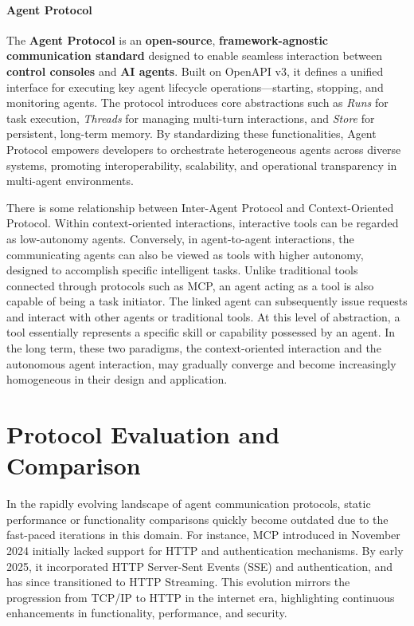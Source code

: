\documentclass[10pt,preprint]{article}
\begin{document}
\paragraph{Agent Protocol~\citep{agentprotocol2025}} The \textbf{Agent Protocol} is an \textbf{open-source}, \textbf{framework-agnostic communication standard} designed to enable seamless interaction between \textbf{control consoles} and \textbf{AI agents}. Built on OpenAPI v3, it defines a unified interface for executing key agent lifecycle operations—starting, stopping, and monitoring agents. The protocol introduces core abstractions such as \textit{Runs} for task execution, \textit{Threads} for managing multi-turn interactions, and \textit{Store} for persistent, long-term memory. By standardizing these functionalities, Agent Protocol empowers developers to orchestrate heterogeneous agents across diverse systems, promoting interoperability, scalability, and operational transparency in multi-agent environments.

There is some relationship between Inter-Agent Protocol and Context-Oriented Protocol. Within context-oriented interactions, interactive tools can be regarded as low-autonomy agents. Conversely, in agent-to-agent interactions, the communicating agents can also be viewed as tools with higher autonomy, designed to accomplish specific intelligent tasks. Unlike traditional tools connected through protocols such as MCP, an agent acting as a tool is also capable of being a task initiator. The linked agent can subsequently issue requests and interact with other agents or traditional tools. At this level of abstraction, a tool essentially represents a specific skill or capability possessed by an agent. In the long term, these two paradigms, the context-oriented interaction and the autonomous agent interaction, may gradually converge and become increasingly homogeneous in their design and application.

\section{Protocol Evaluation and Comparison}

In the rapidly evolving landscape of agent communication protocols, static performance or functionality comparisons quickly become outdated due to the fast-paced iterations in this domain. For instance, MCP introduced in November 2024 initially lacked support for HTTP and authentication mechanisms. By early 2025, it incorporated HTTP Server-Sent Events (SSE) and authentication, and has since transitioned to HTTP Streaming. This evolution mirrors the progression from TCP/IP to HTTP in the internet era, highlighting continuous enhancements in functionality, performance, and security.
\end{document}
